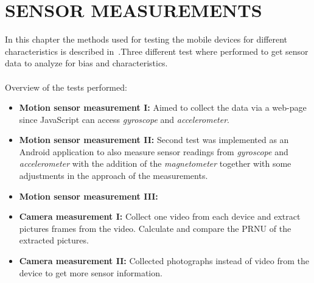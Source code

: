 \chapter{SENSOR MEASUREMENTS}\label{cha:measurements}
In this chapter the methods used for testing the mobile devices for different characteristics is described in~.Three different test where performed to get sensor data to analyze for bias and characteristics. \\
\\
Overview of the tests performed:
\begin{itemize}
  \item[] \textbf{Motion sensor measurement I:} Aimed to collect the data via a web-page since JavaScript can access \textit{gyroscope} and \textit{accelerometer}.
  \item[] \textbf{Motion sensor measurement II:} Second test was implemented as an Android application to also measure sensor readings from \textit{gyroscope} and \textit{accelerometer} with the addition of the \textit{magnetometer} together with some adjustments in the approach of the measurements.
  \item[] \textbf{Motion sensor measurement III:}

  \item \textbf{Camera measurement I:} Collect one video from each device and extract pictures frames from the video. Calculate and compare the PRNU of the extracted pictures.
  \item \textbf{Camera measurement II:} Collected photographs instead of video from the device to get more sensor information. 
\end{itemize}


